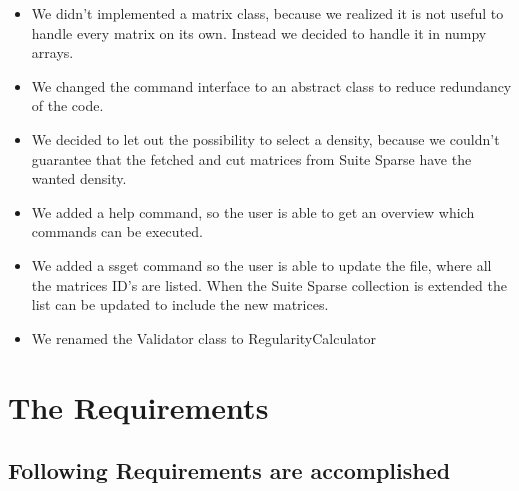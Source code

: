 \documentclass[parskip=full]{scrartcl}
\begin{document}
\begin{itemize}

\item We didn't implemented a matrix class, because we realized it is not useful to handle every matrix on its own. 
Instead we decided to handle it in numpy arrays.

\item We changed the command interface to an abstract class to reduce redundancy of the code.

\item We decided to let out the possibility to select a density, because we couldn't guarantee that the fetched and cut matrices from \gls{Suite Sparse} have the wanted density.

\item We added a help command, so the user is able to get an overview which commands can be executed.

\item We added a \gls{ssget} command so the user is able to update the file, where all the matrices ID's are listed.
When the \gls{Suite Sparse} collection is extended the list can be updated to include the new matrices. 

\item We renamed the Validator class to RegularityCalculator
\end{itemize}


\section{The Requirements}
\subsection{Following Requirements are accomplished}
\end{document}
